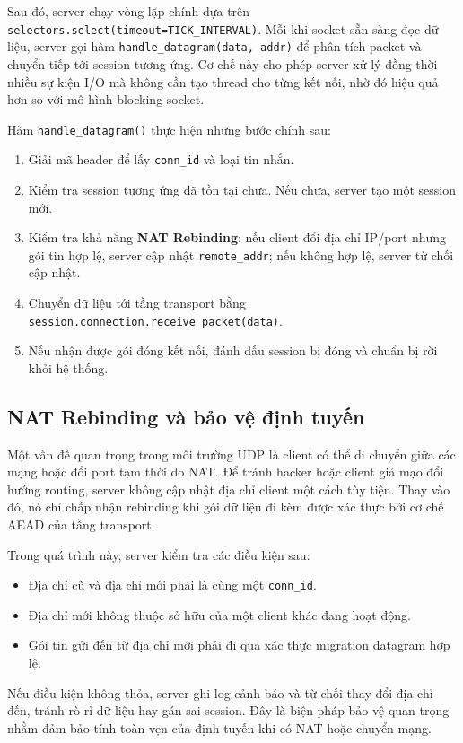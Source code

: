 Sau đó, server chạy vòng lặp chính dựa trên \texttt{selectors.select(timeout=TICK\_INTERVAL)}. Mỗi khi socket sẵn sàng đọc dữ liệu, server gọi hàm \texttt{handle\_datagram(data, addr)} để phân tích packet và chuyển tiếp tới session tương ứng. Cơ chế này cho phép server xử lý đồng thời nhiều sự kiện I/O mà không cần tạo thread cho từng kết nối, nhờ đó hiệu quả hơn so với mô hình blocking socket.

Hàm \texttt{handle\_datagram()} thực hiện những bước chính sau:
\begin{enumerate}
    \item Giải mã header để lấy \texttt{conn\_id} và loại tin nhắn.
    \item Kiểm tra session tương ứng đã tồn tại chưa. Nếu chưa, server tạo một session mới.
    \item Kiểm tra khả năng \textbf{NAT Rebinding}: nếu client đổi địa chỉ IP/port nhưng gói tin hợp lệ, server cập nhật \texttt{remote\_addr}; nếu không hợp lệ, server từ chối cập nhật.
    \item Chuyển dữ liệu tới tầng transport bằng \texttt{session.connection.receive\_packet(data)}.
    \item Nếu nhận được gói đóng kết nối, đánh dấu session bị đóng và chuẩn bị rời khỏi hệ thống.
\end{enumerate}

\subsection{NAT Rebinding và bảo vệ định tuyến}
Một vấn đề quan trọng trong môi trường UDP là client có thể di chuyển giữa các mạng hoặc đổi port tạm thời do NAT. Để tránh hacker hoặc client giả mạo đổi hướng routing, server không cập nhật địa chỉ client một cách tùy tiện. Thay vào đó, nó chỉ chấp nhận rebinding khi gói dữ liệu đi kèm được xác thực bởi cơ chế AEAD của tầng transport.

Trong quá trình này, server kiểm tra các điều kiện sau:
\begin{itemize}
    \item Địa chỉ cũ và địa chỉ mới phải là cùng một \texttt{conn\_id}.
    \item Địa chỉ mới không thuộc sở hữu của một client khác đang hoạt động.
    \item Gói tin gửi đến từ địa chỉ mới phải đi qua xác thực migration datagram hợp lệ.
\end{itemize}

Nếu điều kiện không thỏa, server ghi log cảnh báo và từ chối thay đổi địa chỉ đến, tránh rò rỉ dữ liệu hay gán sai session. Đây là biện pháp bảo vệ quan trọng nhằm đảm bảo tính toàn vẹn của định tuyến khi có NAT hoặc chuyển mạng.

